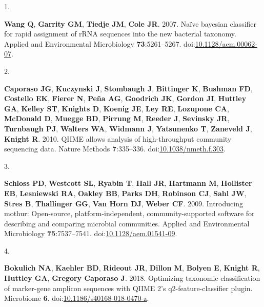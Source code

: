\documentclass[
  11pt,
]{article}
\newlength{\cslhangindent}
\newlength{\csllabelwidth}
\newenvironment{CSLReferences}[2] %
 {\begin{list}{}{%
  \setlength{\itemindent}{0pt}
  \setlength{\leftmargin}{0pt}
  \setlength{\parsep}{0pt}
  \ifodd #1
   \setlength{\leftmargin}{\cslhangindent}
   \setlength{\itemindent}{-1\cslhangindent}
  \fi
  \setlength{\itemsep}{#2\baselineskip}}}
 {\end{list}}
\newcommand{\CSLLeftMargin}[1]{\parbox[t]{\csllabelwidth}{\strut#1\strut}}
\newcommand{\CSLRightInline}[1]{\parbox[t]{\linewidth - \csllabelwidth}{\strut#1\strut}}
\begin{document}
\label{refs}
\begin{CSLReferences}{0}{1}
\CSLLeftMargin{1. }%
\CSLRightInline{\textbf{Wang Q}, \textbf{Garrity GM}, \textbf{Tiedje
JM}, \textbf{Cole JR}. 2007. Naïve bayesian classifier for rapid
assignment of rRNA sequences into the new bacterial taxonomy. Applied
and Environmental Microbiology \textbf{73}:5261--5267.
doi:\href{https://doi.org/10.1128/aem.00062-07}{10.1128/aem.00062-07}.}

\CSLLeftMargin{2. }%
\CSLRightInline{\textbf{Caporaso JG}, \textbf{Kuczynski J},
\textbf{Stombaugh J}, \textbf{Bittinger K}, \textbf{Bushman FD},
\textbf{Costello EK}, \textbf{Fierer N}, \textbf{Peña AG},
\textbf{Goodrich JK}, \textbf{Gordon JI}, \textbf{Huttley GA},
\textbf{Kelley ST}, \textbf{Knights D}, \textbf{Koenig JE}, \textbf{Ley
RE}, \textbf{Lozupone CA}, \textbf{McDonald D}, \textbf{Muegge BD},
\textbf{Pirrung M}, \textbf{Reeder J}, \textbf{Sevinsky JR},
\textbf{Turnbaugh PJ}, \textbf{Walters WA}, \textbf{Widmann J},
\textbf{Yatsunenko T}, \textbf{Zaneveld J}, \textbf{Knight R}. 2010.
QIIME allows analysis of high-throughput community sequencing data.
Nature Methods \textbf{7}:335--336.
doi:\href{https://doi.org/10.1038/nmeth.f.303}{10.1038/nmeth.f.303}.}

\CSLLeftMargin{3. }%
\CSLRightInline{\textbf{Schloss PD}, \textbf{Westcott SL},
\textbf{Ryabin T}, \textbf{Hall JR}, \textbf{Hartmann M},
\textbf{Hollister EB}, \textbf{Lesniewski RA}, \textbf{Oakley BB},
\textbf{Parks DH}, \textbf{Robinson CJ}, \textbf{Sahl JW}, \textbf{Stres
B}, \textbf{Thallinger GG}, \textbf{Van Horn DJ}, \textbf{Weber CF}.
2009. Introducing mothur: Open-source, platform-independent,
community-supported software for describing and comparing microbial
communities. Applied and Environmental Microbiology
\textbf{75}:7537--7541.
doi:\href{https://doi.org/10.1128/aem.01541-09}{10.1128/aem.01541-09}.}

\CSLLeftMargin{4. }%
\CSLRightInline{\textbf{Bokulich NA}, \textbf{Kaehler BD},
\textbf{Rideout JR}, \textbf{Dillon M}, \textbf{Bolyen E},
\textbf{Knight R}, \textbf{Huttley GA}, \textbf{Gregory Caporaso J}.
2018. Optimizing taxonomic classification of marker-gene amplicon
sequences with QIIME 2's q2-feature-classifier plugin. Microbiome
\textbf{6}.
doi:\href{https://doi.org/10.1186/s40168-018-0470-z}{10.1186/s40168-018-0470-z}.}


\end{CSLReferences}
\end{document}
